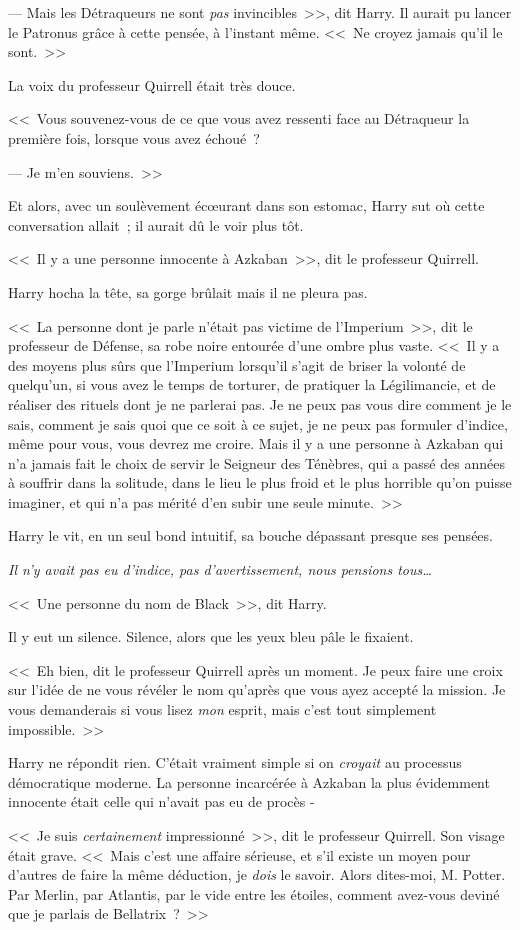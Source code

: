 --- Mais les Détraqueurs ne sont \emph{pas} invincibles~>>, dit Harry. Il aurait pu lancer le Patronus grâce à cette pensée, à l'instant même. <<~Ne croyez jamais qu'il le sont.~>>

La voix du professeur Quirrell était très douce.

<<~Vous souvenez-vous de ce que vous avez ressenti face au Détraqueur la première fois, lorsque vous avez échoué~?

--- Je m'en souviens.~>>

Et alors, avec un soulèvement écœurant dans son estomac, Harry sut où cette conversation allait~; il aurait dû le voir plus tôt.

<<~Il y a une personne innocente à Azkaban~>>, dit le professeur Quirrell.

Harry hocha la tête, sa gorge brûlait mais il ne pleura pas.

<<~La personne dont je parle n'était pas victime de l'Imperium~>>, dit le professeur de Défense, sa robe noire entourée d'une ombre plus vaste. <<~Il y a des moyens plus sûrs que l'Imperium lorsqu'il s'agit de briser la volonté de quelqu'un, si vous avez le temps de torturer, de pratiquer la Légilimancie, et de réaliser des rituels dont je ne parlerai pas. Je ne peux pas vous dire comment je le sais, comment je sais quoi que ce soit à ce sujet, je ne peux pas formuler d'indice, même pour vous, vous devrez me croire. Mais il y a une personne à Azkaban qui n'a jamais fait le choix de servir le Seigneur des Ténèbres, qui a passé des années à souffrir dans la solitude, dans le lieu le plus froid et le plus horrible qu'on puisse imaginer, et qui n'a pas mérité d'en subir une seule minute.~>>

Harry le vit, en un seul bond intuitif, sa bouche dépassant presque ses pensées.

\emph{Il n'y avait pas eu d'indice, pas d'avertissement, nous pensions tous…}

<<~Une personne du nom de Black~>>, dit Harry.

Il y eut un silence. Silence, alors que les yeux bleu pâle le fixaient.

<<~Eh bien, dit le professeur Quirrell après un moment. Je peux faire une croix sur l'idée de ne vous révéler le nom qu'après que vous ayez accepté la mission. Je vous demanderais si vous lisez \emph{mon} esprit, mais c'est tout simplement impossible.~>>

Harry ne répondit rien. C'était vraiment simple si on \emph{croyait} au processus démocratique moderne. La personne incarcérée à Azkaban la plus évidemment innocente était celle qui n'avait pas eu de procès -

<<~Je suis \emph{certainement} impressionné~>>, dit le professeur Quirrell. Son visage était grave. <<~Mais c'est une affaire sérieuse, et s'il existe un moyen pour d'autres de faire la même déduction, je \emph{dois} le savoir. Alors dites-moi, M. Potter. Par Merlin, par Atlantis, par le vide entre les étoiles, comment avez-vous deviné que je parlais de Bellatrix~?~>>
